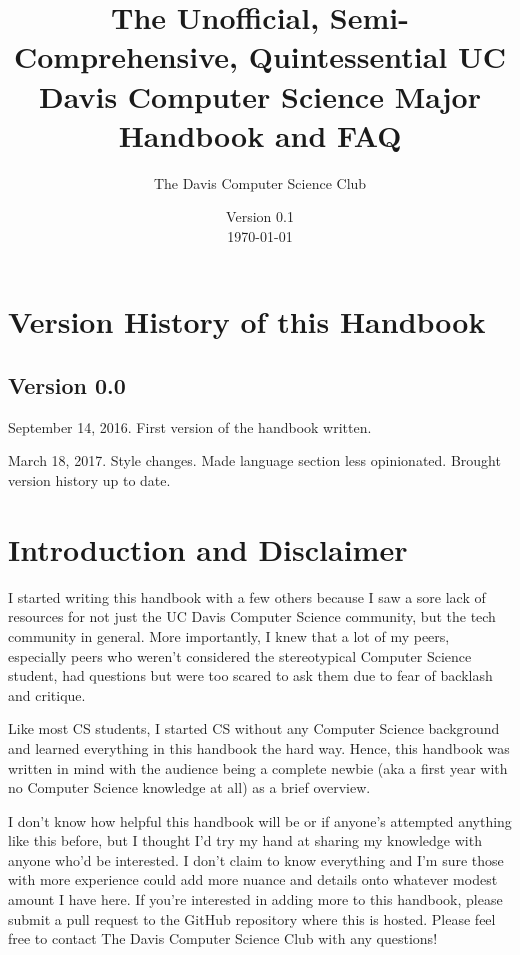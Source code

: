 \documentclass{article}
\title{The Unofficial, Semi-Comprehensive, Quintessential UC Davis Computer
  Science Major Handbook and FAQ}
\author{The Davis Computer Science Club}
\date{Version 0.1\\\today}
\begin{document}
\begin{titlepage}
	\maketitle
\end{titlepage}

\tableofcontents

\pagebreak

\singlespacing
\sectionfont{\Large}
\subsectionfont{\large}

\section {Version History of this Handbook}
\subsection*{Version 0.0}
September 14, 2016. First version of the handbook written.

March 18, 2017. Style changes. Made language section less opinionated. Brought
version history up to date.
\newpage
\section{Introduction and Disclaimer}
I started writing this handbook with a few others because I saw a sore lack of
resources for not just the UC Davis Computer Science community, but the tech
community in general. More importantly, I knew that a lot of my peers,
especially peers who weren't considered the stereotypical Computer Science
student, had questions but were too scared to ask them due to fear of backlash
and critique.

Like most CS students, I started CS without any Computer Science background and
learned everything in this handbook the hard way. Hence, this handbook was
written in mind with the audience being a complete newbie (aka a first year with
no Computer Science knowledge at all) as a brief overview.

I don't know how helpful this handbook will be or if anyone's attempted anything
like this before, but I thought I'd try my hand at sharing my knowledge with
anyone who'd be interested. I don't claim to know everything and I'm sure those
with more experience could add more nuance and details onto whatever modest
amount I have here. If you're interested in adding more to this handbook, please
submit a pull request to the GitHub repository where this is hosted. Please feel
free to contact The Davis Computer Science Club with any questions!
\end{document}

